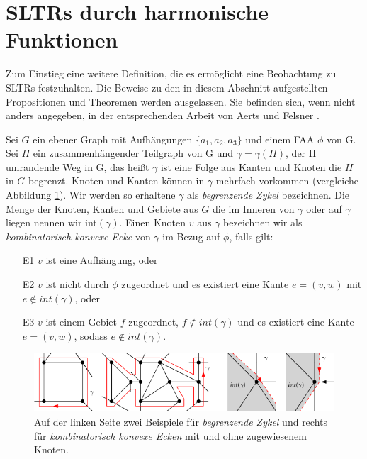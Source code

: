 \section{SLTRs durch harmonische Funktionen}\label{harmonic_approach}

Zum Einstieg eine weitere Definition, die es ermöglicht eine Beobachtung zu SLTRs festzuhalten. Die Beweise zu den in diesem Abschnitt aufgestellten Propositionen und Theoremen werden ausgelassen. Sie befinden sich, wenn nicht anders angegeben, in der entsprechenden Arbeit von Aerts und Felsner \cite{af13}.

\begin{definition}\label{def_ccc}
Sei $G$ ein ebener Graph mit Aufhängungen $\{a_1,a_2,a_3\}$ und einem FAA $\phi$ von G. Sei $H$ ein zusammenhängender Teilgraph von G und $\gamma=\gamma(H)$, der H umrandende Weg in G, das heißt $\gamma$ ist eine Folge aus Kanten und Knoten die $H$ in $G$ begrenzt. Knoten und Kanten können in $\gamma$ mehrfach vorkommen (vergleiche Abbildung \ref{corner_def}). Wir werden so erhaltene $\gamma$ als \textit{begrenzende Zykel} bezeichnen. Die Menge der Knoten, Kanten und Gebiete aus $G$ die im Inneren von $\gamma$ oder auf $\gamma$ liegen nennen wir int$(\gamma)$. Einen Knoten $v$ aus $\gamma$ bezeichnen wir als \textit{kombinatorisch konvexe Ecke} von $\gamma$ im Bezug auf $\phi$, falls gilt:
\begin{itemize}
\item [E1] $v$ ist eine Aufhängung, oder
\item [E2] $v$ ist nicht durch $\phi$ zugeordnet und es existiert eine Kante $e = (v,w)$ mit $e \notin int(\gamma)$, oder
\item [E3] $v$ ist einem Gebiet $f$ zugeordnet, $f \notin int(\gamma)$ und es existiert eine Kante $e = (v,w)$, sodass $e \notin int(\gamma)$.
\end{itemize}
\end{definition}

\begin{figure}[h]
	\centering
  \includegraphics[width=1\textwidth]{corner_def.png}
  \caption{Auf der linken Seite zwei Beispiele für \textit{begrenzende Zykel} und rechts für \textit{kombinatorisch konvexe Ecken} mit und ohne zugewiesenem Knoten.}
  \label{corner_def}
\end{figure}

